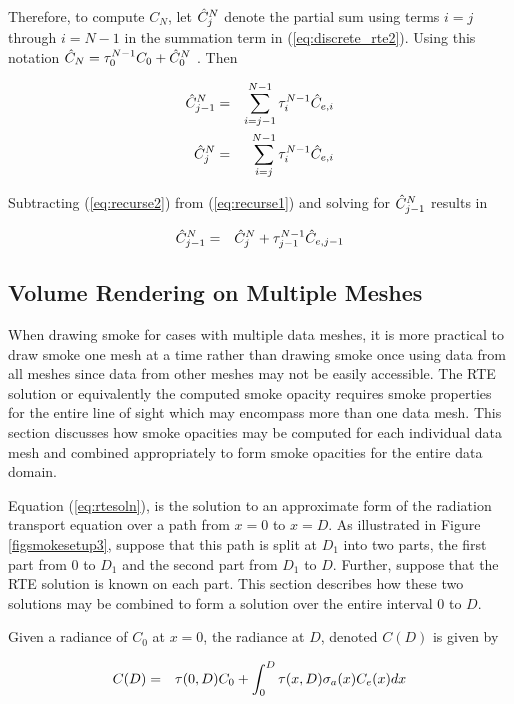 Therefore, to compute $C_N$,
let $\hat{C}_{j}^N$ denote the partial sum using terms $i=j$ through $i=N-1$ in the summation term in (\ref{eq:discrete_rte2}).  Using this notation $\hat{C}_N=\tau_{0}^{N-1}C_0+\hat{C}_{0}^N$ . Then

\begin{eqnarray}
\label{eq:recurse1}
\hat{C}_{j-1}^N &= &\sum_{i=j-1}^{N-1}\tau_{i}^{N-1}\hat{C}_{e,i}\\
\label{eq:recurse2}
\hat{C}_{j}^N     &= &\sum_{i=j}^{N-1}  \tau_{i}^{N-1}\hat{C}_{e,i}
\end{eqnarray}

Subtracting (\ref{eq:recurse2}) from (\ref{eq:recurse1}) and solving for $\hat{C}_{j-1}^N$ results in

\begin{eqnarray*}
\hat{C}_{j-1}^N&=&\hat{C}_{j}^N+\tau_{j-1}^{N-1}\hat{C}_{e,j-1}
\end{eqnarray*}

%
%

\subsection{Volume Rendering on Multiple Meshes}
When drawing smoke for cases with multiple data meshes, it is more practical to draw smoke one mesh at a time rather than drawing smoke once using data from all meshes since data from other meshes may not be easily accessible.  The RTE solution or equivalently the computed smoke opacity requires smoke properties for the entire line of sight which may encompass more than one data mesh.  This section discusses how smoke opacities may be computed for each individual data mesh and combined appropriately to form smoke opacities for the entire data domain.

Equation (\ref{eq:rtesoln}), is the solution to an approximate form of the radiation transport equation over a path from $x=0$ to $x=D$.  As illustrated in Figure \ref{figsmokesetup3}, suppose that this path is split at $D_1$ into two parts, the first part from $0$ to $D_1$ and the second part from $D_1$ to $D$. Further, suppose that the RTE solution is known on each part. This section describes how these two solutions may be combined to form a solution over the entire interval $0$ to $D$.

Given a radiance of $C_0$ at $x=0$, the radiance at $D$, denoted $C(D)$ is given by

\begin{eqnarray}
\label{eq:rtesoln2}
C(D)&=&\tau(0,D)C_0 + \int_0^D\tau(x,D)\sigma_a(x)C_e(x) dx
\end{eqnarray}

